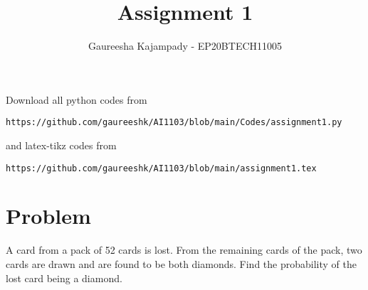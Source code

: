 \documentclass[journal,12pt,twocolumn]{IEEEtran}
\begin{document}
\def\putbox#1#2#3{\makebox[0in][l]{\makebox[#1][l]{}\raisebox{\baselineskip}[0in][0in]{\raisebox{#2}[0in][0in]{#3}}}}
     \def\rightbox#1{\makebox[0in][r]{#1}}  
     \def\centbox#1{\makebox[0in]{#1}}
     \def\topbox#1{\raisebox{-\baselineskip}[0in][0in]{#1}}
     \def\midbox#1{\raisebox{-0.5\baselineskip}[0in][0in]{#1}}
\vspace{3cm}
\title{Assignment 1}
\author{Gaureesha Kajampady - EP20BTECH11005}
\maketitle  
\newpage
\bigskip
\renewcommand{\thefigure}{\theenumi}
\renewcommand{\thetable}{\theenumi}
Download all python codes from 
\begin{lstlisting}
https://github.com/gaureeshk/AI1103/blob/main/Codes/assignment1.py
\end{lstlisting}
%
and latex-tikz codes from 
%
\begin{lstlisting}
https://github.com/gaureeshk/AI1103/blob/main/assignment1.tex
\end{lstlisting}
\section{Problem}
 A card from a pack of 52 cards is lost. From
the remaining cards of the pack, two cards
are drawn and are found to be both diamonds.
Find the probability of the lost card being a
diamond.
\end{document}
